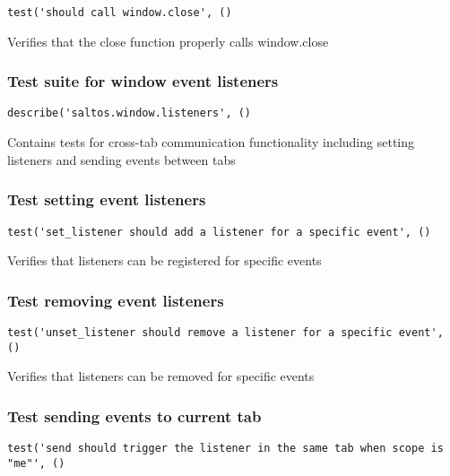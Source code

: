\documentclass[a4paper]{article}
\begin{document}
\begin{lstlisting}
test('should call window.close', ()
\end{lstlisting}

Verifies that the close function properly calls window.close

\hypertarget{toc729}{}
\subsubsection{Test suite for window event listeners}

\begin{lstlisting}
describe('saltos.window.listeners', ()
\end{lstlisting}

Contains tests for cross-tab communication functionality
including setting listeners and sending events between tabs

\hypertarget{toc730}{}
\subsubsection{Test setting event listeners}

\begin{lstlisting}
test('set_listener should add a listener for a specific event', ()
\end{lstlisting}

Verifies that listeners can be registered for specific events

\hypertarget{toc731}{}
\subsubsection{Test removing event listeners}

\begin{lstlisting}
test('unset_listener should remove a listener for a specific event', ()
\end{lstlisting}

Verifies that listeners can be removed for specific events

\hypertarget{toc732}{}
\subsubsection{Test sending events to current tab}

\begin{lstlisting}
test('send should trigger the listener in the same tab when scope is "me"', ()
\end{lstlisting}
\end{document}
